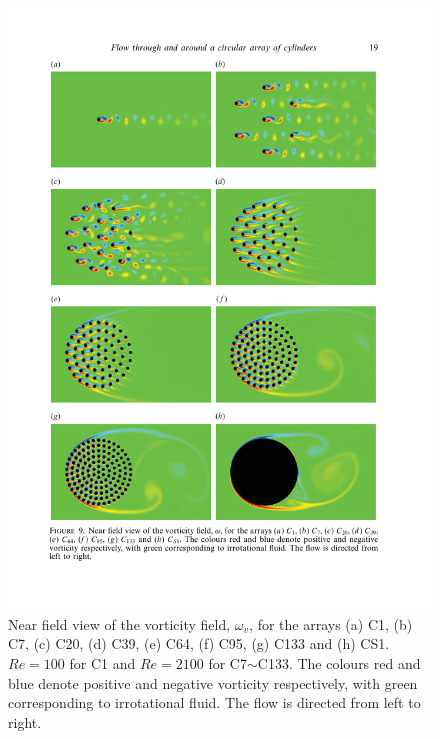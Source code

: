 \begin{figure}[tbp]
	\centering
	\includegraphics[height=1.3\textwidth]{Figs/multicylinders}
	\caption{Near field view of the vorticity field, $ \omega_v $, for the arrays (a) C1, (b) C7, (c) C20, (d) C39, (e) C64, (f) C95, (g) C133 and (h) CS1. $ Re=100 $ for C1 and $ Re=2100 $ for C7$ \sim $C133. The colours red and blue denote positive and negative vorticity respectively, with green corresponding to irrotational fluid. The flow is directed from left to right. \cite{Nicolle2011}}
	\label{fig:multicylinders}
\end{figure}


